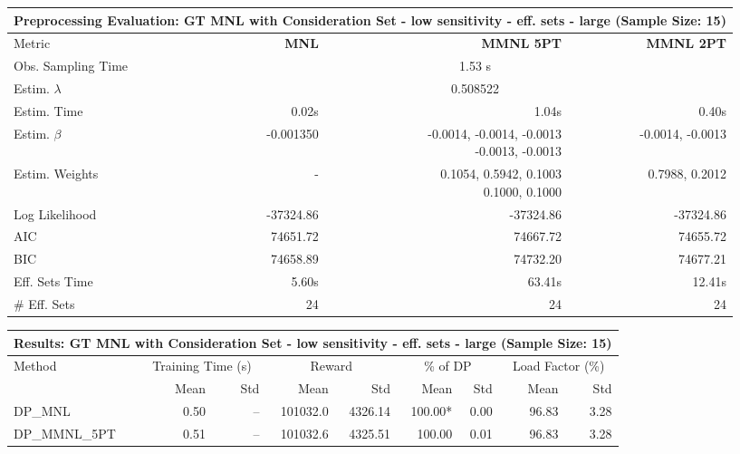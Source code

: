 
\begin{samepage}
\begin{center}
  \small
  \begin{tabular}{l|r|r|r}
    \toprule
    \multicolumn{4}{c}{\textbf{Preprocessing Evaluation: GT MNL with Consideration Set - low sensitivity - eff. sets - large (Sample Size: 15)}} \\
    \midrule
    Metric & \textbf{MNL} & \textbf{MMNL 5PT} & \textbf{MMNL 2PT} \\
    \midrule
    Obs. Sampling Time & \multicolumn{3}{c}{1.53 s} \\
    Estim. $\lambda$ & \multicolumn{3}{c}{0.508522} \\
    Estim. Time & 0.02s & 1.04s & 0.40s \\
    Estim. $\beta$ & -0.001350 & \makecell[tr]{-0.0014, -0.0014, -0.0013 \\ -0.0013, -0.0013} & -0.0014, -0.0013 \\
    Estim. Weights & - & \makecell[tr]{0.1054, 0.5942, 0.1003 \\ 0.1000, 0.1000} & 0.7988, 0.2012 \\
    Log Likelihood & -37324.86 & -37324.86 & -37324.86 \\
    AIC & 74651.72 & 74667.72 & 74655.72 \\
    BIC & 74658.89 & 74732.20 & 74677.21 \\
    Eff. Sets Time & 5.60s & 63.41s & 12.41s \\
    \# Eff. Sets & 24 & 24 & 24 \\
    \bottomrule
  \end{tabular}
\end{center}
\begin{center}
  \small
  \begin{tabular}{l|rr|rr|rr|rr}
    \toprule
    \multicolumn{9}{c}{\textbf{Results: GT MNL with Consideration Set - low sensitivity - eff. sets - large (Sample Size: 15)}} \\
    \midrule
    Method & \multicolumn{2}{c|}{Training Time (s)} & \multicolumn{2}{c|}{Reward} & \multicolumn{2}{c|}{\% of DP} & \multicolumn{2}{c}{Load Factor (\%)} \\
    & Mean & Std & Mean & Std & Mean & Std & Mean & Std \\
    \midrule
    DP\_MNL      &     0.50 &    -- &   101032.0 &    4326.14 & 100.00* &    0.00 &   96.83 &    3.28 \\
    DP\_MMNL\_5PT &     0.51 &    -- &   101032.6 &    4325.51 &  100.00 &    0.01 &   96.83 &    3.28 \\

\end{tabular}
\end{center}
\end{samepage}
